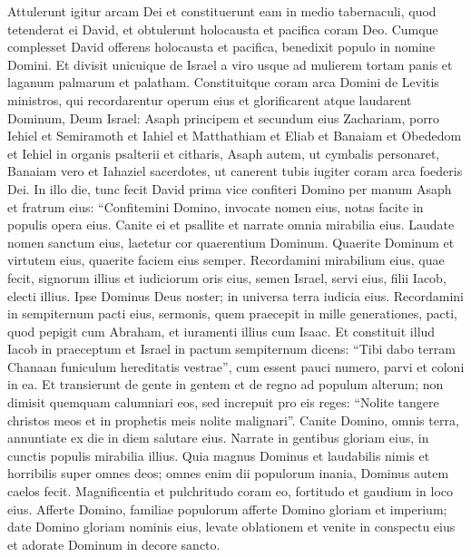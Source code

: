 \begin{biblechapter}  
\verse Attulerunt igitur arcam Dei et constituerunt eam in medio tabernaculi, quod tetenderat ei David, et obtulerunt holocausta et pacifica coram Deo. 
\verse Cumque complesset David offerens holocausta et pacifica, benedixit populo in nomine Domini. 
\verse Et divisit unicuique de Israel a viro usque ad mulierem tortam panis et laganum palmarum et palatham. 
\verse Constituitque coram arca Domini de Levitis ministros, qui recordarentur operum eius et glorificarent atque laudarent Dominum, Deum Israel: 
\verse Asaph principem et secundum eius Zachariam, porro Iehiel et Semiramoth et Iahiel et Matthathiam et Eliab et Banaiam et Obededom et Iehiel in organis psalterii et citharis, Asaph autem, ut cymbalis personaret, 
\verse Banaiam vero et Iahaziel sacerdotes, ut canerent tubis iugiter coram arca foederis Dei. 
\verse In illo die, tunc fecit David prima vice confiteri Domino per manum Asaph et fratrum eius: 
\verse “Confitemini Domino, invocate nomen eius, notas facite in populis opera eius. 
\verse Canite ei et psallite et narrate omnia mirabilia eius. 
\verse Laudate nomen sanctum eius, laetetur cor quaerentium Dominum. 
\verse Quaerite Dominum et virtutem eius, quaerite faciem eius semper. 
\verse Recordamini mirabilium eius, quae fecit, signorum illius et iudiciorum oris eius, 
\verse semen Israel, servi eius, filii Iacob, electi illius. 
\verse Ipse Dominus Deus noster; in universa terra iudicia eius. 
\verse Recordamini in sempiternum pacti eius, sermonis, quem praecepit in mille generationes, 
\verse pacti, quod pepigit cum Abraham, et iuramenti illius cum Isaac. 
\verse Et constituit illud Iacob in praeceptum et Israel in pactum sempiternum 
\verse dicens: “Tibi dabo terram Chanaan funiculum hereditatis vestrae”, 
\verse cum essent pauci numero, parvi et coloni in ea. 
\verse Et transierunt de gente in gentem et de regno ad populum alterum; 
\verse non dimisit quemquam calumniari eos, sed increpuit pro eis reges: 
\verse “Nolite tangere christos meos et in prophetis meis nolite malignari”. 
\verse Canite Domino, omnis terra, annuntiate ex die in diem salutare eius. 
\verse Narrate in gentibus gloriam eius, in cunctis populis mirabilia illius. 
\verse Quia magnus Dominus et laudabilis nimis et horribilis super omnes deos; 
\verse omnes enim dii populorum inania, Dominus autem caelos fecit. 
\verse Magnificentia et pulchritudo coram eo, fortitudo et gaudium in loco eius. 
\verse Afferte Domino, familiae populorum afferte Domino gloriam et imperium; 
\verse date Domino gloriam nominis eius, levate oblationem et venite in conspectu eius et adorate Dominum in decore sancto. 

\end{biblechapter}
